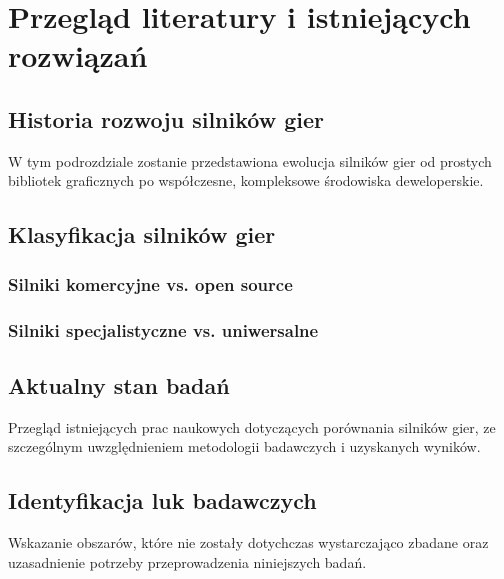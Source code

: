 \clearpage
\section{Przegląd literatury i istniejących rozwiązań}

\subsection{Historia rozwoju silników gier}
W tym podrozdziale zostanie przedstawiona ewolucja silników gier od prostych bibliotek graficznych po współczesne, kompleksowe środowiska deweloperskie.

\subsection{Klasyfikacja silników gier}
\subsubsection{Silniki komercyjne vs. open source}

\subsubsection{Silniki specjalistyczne vs. uniwersalne}

\subsection{Aktualny stan badań}
Przegląd istniejących prac naukowych dotyczących porównania silników gier, ze szczególnym uwzględnieniem metodologii badawczych i uzyskanych wyników.

\subsection{Identyfikacja luk badawczych}
Wskazanie obszarów, które nie zostały dotychczas wystarczająco zbadane oraz uzasadnienie potrzeby przeprowadzenia niniejszych badań.

